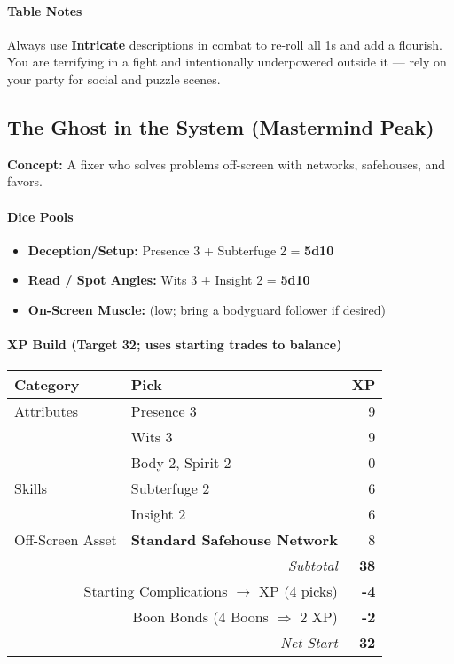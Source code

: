 \documentclass[11pt]{book}
\begin{document}
\paragraph{Table Notes}
Always use \textbf{Intricate} descriptions in combat to re-roll all 1s and add a flourish. You are terrifying in a fight and intentionally underpowered outside it — rely on your party for social and puzzle scenes.

\bigskip

\subsection*{The Ghost in the System (Mastermind Peak)}
\textbf{Concept:} A fixer who solves problems off-screen with networks, safehouses, and favors.

\paragraph{Dice Pools}
\begin{itemize}
  \item \textbf{Deception/Setup:} Presence 3 + Subterfuge 2 = \textbf{5d10}
  \item \textbf{Read / Spot Angles:} Wits 3 + Insight 2 = \textbf{5d10}
  \item \textbf{On-Screen Muscle:} (low; bring a bodyguard follower if desired)
\end{itemize}

\paragraph{XP Build (Target 32; uses starting trades to balance)}
\begin{tabular}{@{}llr@{}}
\toprule
\textbf{Category} & \textbf{Pick} & \textbf{XP} \\
\midrule
Attributes & Presence 3 & 9 \\
           & Wits 3 & 9 \\
           & Body 2, Spirit 2 & 0 \\
Skills     & Subterfuge 2 & 6 \\
           & Insight 2 & 6 \\
Off-Screen Asset & \textbf{Standard Safehouse Network} & 8 \\
\midrule
\multicolumn{2}{r}{\textit{Subtotal}} & \textbf{38} \\
\multicolumn{2}{r}{Starting Complications $\rightarrow$ XP (4 picks)} & \textbf{-4} \\
\multicolumn{2}{r}{Boon Bonds (4 Boons $\Rightarrow$ 2 XP)} & \textbf{-2} \\
\midrule
\multicolumn{2}{r}{\textit{Net Start}} & \textbf{32} \\
\bottomrule
\end{tabular}
\end{document}
